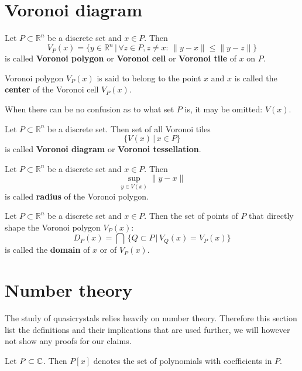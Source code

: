 \documentclass[text.tex]{subfiles}
\begin{document}
\section{Voronoi diagram}\label{sec_voronoi} %
\begin{definition}
Let $P\subset \mathbb{R}^n$ be a discrete set and $x\in P$. Then
$$V_P(x) = \{ y \in \mathbb{R}^n \,|\, \forall z \in P, z\neq x:\, \|y-x\|\leq\|y-z\| \}$$
is called \textbf{Voronoi polygon} or \textbf{Voronoi cell} or \textbf{Voronoi tile} of $x$ on $P$.

Voronoi polygon $V_P(x)$ is said to belong to the point $x$ and $x$ is called the \textbf{center} of the Voronoi cell $V_P(x)$. 

When there can be no confusion as to what set $P$ is, it may be omitted: $V(x)$.
\end{definition}

\begin{definition}
Let $P\subset \mathbb{R}^n$ be a discrete set. Then set of all Voronoi tiles
$$\{V(x)\,|\, x\in P\}$$
is called \textbf{Voronoi diagram} or \textbf{Voronoi tessellation}. 
\end{definition}

\begin{definition}
Let $P\subset \mathbb{R}^n$ be a discrete set and $x\in P$. Then
$$\sup_{y\in V(x)}\lVert y-x\rVert$$
is called \textbf{radius} of the Voronoi polygon. 
\end{definition}

\begin{definition}
Let $P\subset \mathbb{R}^n$ be a discrete set and $x\in P$. Then the set of points of $P$ that directly shape the Voronoi polygon $V_P(x)$:
$$D_P(x) = \bigcap\, \big\{ Q\subset P\,|\, V_Q(x) = V_P(x) \big\}$$
is called the \textbf{domain} of $x$ or of $V_P(x)$. 
\end{definition}

\section{Number theory}\label{sec_numberTheory} %
The study of quasicrystals relies heavily on number theory. Therefore this section list the definitions and their implications that are used further, we will however not show any proofs for our claims.
\begin{definition}
Let $P\subset\mathbb{C}$. Then $P[x]$ denotes the set of polynomials with coefficients in $P$. 
\end{definition}
\end{document}
